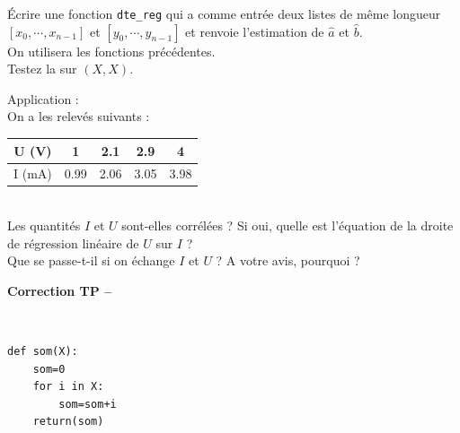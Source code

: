 \begin{exercice}
\' Ecrire une fonction \verb?dte_reg? qui a comme entr\' ee deux listes de m\^ eme longueur $[x_0,\cdots,x_{n-1}]$ et $[y_0,\cdots,y_{n-1}]$ et renvoie l'estimation de $\hat{a}$ et $\hat{b}$.\\
On utilisera les fonctions pr\' ec\' edentes.\\
Testez la sur $(X,X)$.
\end{exercice}


\begin{exercice}
Application : \\
On a les relev\' es suivants :
\begin{tabular}{|c|cccc|}
\hline
U (V) & 1&2.1&2.9&4\\ \hline
I (mA)&0.99&2.06&3.05&3.98\\\hline
\end{tabular}\\
Les quantit\' es $I$ et $U$ sont-elles corr\' el\' ees ? Si oui, quelle est l'\' equation de la droite de r\' egression lin\' eaire de $U$ sur $I$ ?\\
Que se passe-t-il si on \' echange $I$ et $U$ ? A votre avis, pourquoi ?
\end{exercice}






\ifdef{\public}{}{}

\newpage 

\begin{center}
{\Large\bf Correction TP \no {\numero} -- \descrip}
\end{center}



\begin{solution}~\\
\vspace*{-0.7cm}
 \begin{verbatim}
def som(X):
    som=0
    for i in X:
        som=som+i
    return(som)    
\end{verbatim}
\end{solution}


